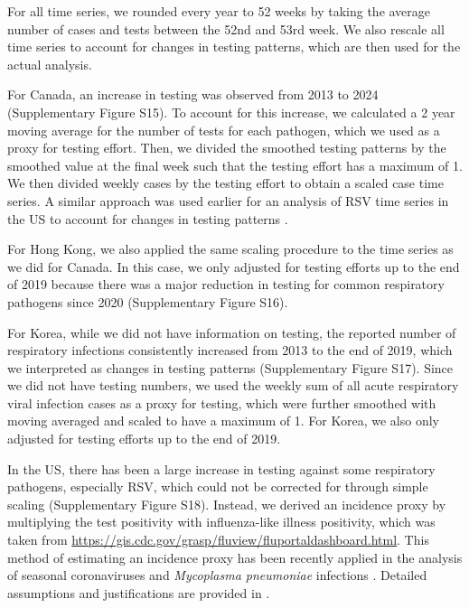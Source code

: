 \documentclass[12pt]{article}
\begin{document}
For all time series, we rounded every year to 52 weeks by taking the average number of cases and tests between the 52nd and 53rd week.
We also rescale all time series to account for changes in testing patterns, which are then used for the actual analysis.

For Canada, an increase in testing was observed from 2013 to 2024 (Supplementary Figure S15).
To account for this increase, we calculated a 2 year moving average for the number of tests for each pathogen, which we used as a proxy for testing effort.
Then, we divided the smoothed testing patterns by the smoothed value at the final week such that the testing effort has a maximum of 1.
We then divided weekly cases by the testing effort to obtain a scaled case time series.
A similar approach was used earlier for an analysis of RSV time series in the US to account for changes in testing patterns \citep{pitzer2015environmental}.

For Hong Kong, we also applied the same scaling procedure to the time series as we did for Canada.
In this case, we only adjusted for testing efforts up to the end of 2019 because there was a major reduction in testing for common respiratory pathogens since 2020 (Supplementary Figure S16).

For Korea, while we did not have information on testing, the reported number of respiratory infections consistently increased from 2013 to the end of 2019, which we interpreted as changes in testing patterns (Supplementary Figure S17).
Since we did not have testing numbers, we used the weekly sum of all acute respiratory viral infection cases as a proxy for testing, which were further smoothed with moving averaged and scaled to have a maximum of 1.
For Korea, we also only adjusted for testing efforts up to the end of 2019.

In the US, there has been a large increase in testing against some respiratory pathogens, especially RSV, which could not be corrected for through simple scaling (Supplementary Figure S18).
Instead, we derived an incidence proxy by multiplying the test positivity with influenza-like illness positivity, which was taken from \url{https://gis.cdc.gov/grasp/fluview/fluportaldashboard.html}.
This method of estimating an incidence proxy has been recently applied in the analysis of seasonal coronaviruses \citep{kissler2020projecting} and \textit{Mycoplasma pneumoniae} infections \citep{park2024predicting}.
Detailed assumptions and justifications are provided in \citep{goldstein2011predicting}.
\end{document}
